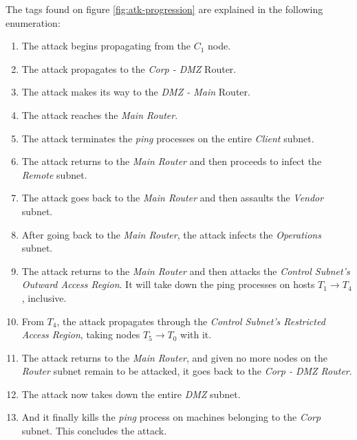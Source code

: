             The tags found on figure \ref{fig:atk-progression} are explained in the following enumeration:\\

            \begin{enumerate}
                \item The attack begins propagating from the $C_1$ node.
                \item The attack propagates to the \textit{Corp - DMZ} Router.
                \item The attack makes its way to the \textit{DMZ - Main} Router.
                \item The attack reaches the \textit{Main Router}.
                \item The attack terminates the \textit{ping} processes on the entire \textit{Client} subnet.
                \item The attack returns to the \textit{Main Router} and then proceeds to infect the \textit{Remote} subnet.
                \item The attack goes back to the \textit{Main Router} and then assaults the \textit{Vendor} subnet.
                \item After going back to the \textit{Main Router}, the attack infects the \textit{Operations} subnet.
                \item The attack returns to the \textit{Main Router} and then attacks the \textit{Control Subnet's Outward Access Region}. It will take down the ping processes on hosts $T_1 \to T_4$, inclusive.
                \item From $T_4$, the attack propagates through the \textit{Control Subnet's Restricted Access Region}, taking nodes $T_5 \to T_0$ with it.
                \item The attack returns to the \textit{Main Router}, and given no more nodes on the \textit{Router} subnet remain to be attacked, it goes back to the \textit{Corp - DMZ Router}.
                \item The attack now takes down the entire \textit{DMZ} subnet.
                \item And it finally kills the \textit{ping} process on machines belonging to the \textit{Corp} subnet. This concludes the attack.
            \end{enumerate}

